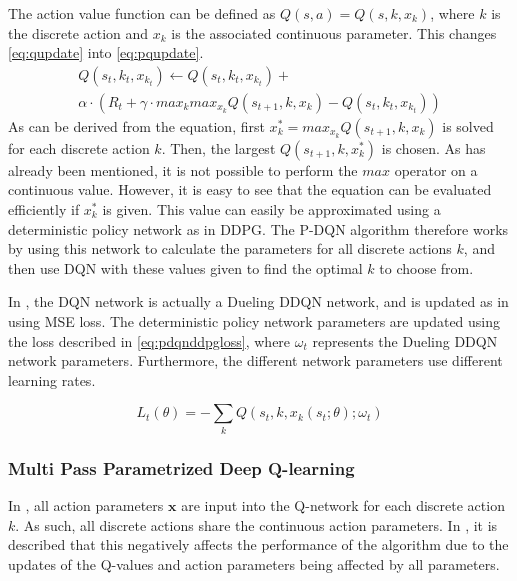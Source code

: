 \documentclass{kththesis}
\begin{document}
The action value function can be defined as $Q(s, a) = Q(s, k, x_k)$, where $k$ is the discrete action and $x_k$ is the associated continuous parameter. This changes \autoref{eq:qupdate} into \autoref{eq:pqupdate}. 
\begin{equation}
\label{eq:pqupdate}
\begin{split}
Q(s_t, k_t, x_{k_t}) \leftarrow Q(s_t, k_t, x_{k_t}) + \\ \alpha \cdot (R_t + \gamma \cdot max_k max_{x_k} Q(s_{t+1}, k, x_k) - Q(s_t, k_t, x_{k_t}))
\end{split}
\end{equation}
As can be derived from the equation, first $x_k^* = max_{x_k}Q(s_{t+1}, k, x_k)$ is solved for each discrete action $k$. Then, the largest $Q(s_{t+1}, k, x_k^*)$ is chosen. As has already been mentioned, it is not possible to perform the $max$ operator on a continuous value. However, it is easy to see that the equation can be evaluated efficiently if $x_k^*$ is given. This value can easily be approximated using a deterministic policy network as in DDPG. The P-DQN algorithm therefore works by using this network to calculate the parameters for all discrete actions $k$, and then use DQN with these values given to find the optimal $k$ to choose from. \parencite{xiong2018parametrized}

In \textcite{xiong2018parametrized}, the DQN network is actually a Dueling DDQN network, and is updated as in \textcite{mnih2015human} using MSE loss. The deterministic policy network parameters are updated using the loss described in \autoref{eq:pdqnddpgloss}, where $\omega_t$ represents the Dueling DDQN network parameters. Furthermore, the different network parameters use different learning rates.

\begin{equation}
\label{eq:pdqnddpgloss}
L_t(\theta) = -\sum_kQ(s_t, k, x_k(s_t;\theta);\omega_t)
\end{equation}

\subsubsection{Multi Pass Parametrized Deep Q-learning}
In \textcite{xiong2018parametrized}, all action parameters $\boldsymbol{x}$ are input into the Q-network for each discrete action $k$. As such, all discrete actions share the continuous action parameters. In \textcite{bester2019mpdqn}, it is described that this negatively affects the performance of the algorithm due to the updates of the Q-values and action parameters being affected by all parameters. 
\end{document}
